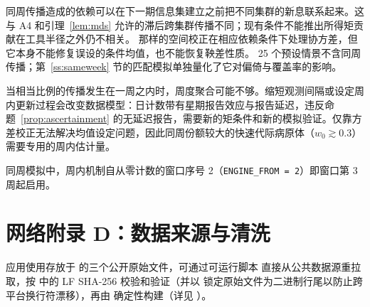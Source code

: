 \documentclass[11pt,a4paper]{ctexart}
\theoremstyle{definition}
\begin{document}
同周传播造成的依赖可以在下一期信息集建立之前把不同集群的新息联系起来。这与 A4 和引理~\ref{lem:mds} 允许的滞后跨集群传播不同；现有条件不能推出所得矩贡献在工具半径之外仍不相关。\citet{conley1999gmm} 那样的空间校正在相应依赖条件下处理协方差，但它本身不能修复误设的条件均值，也不能恢复鞅差性质。
25 个预设情景不含同周传播；第~\ref{ss:sameweek} 节的匹配模拟单独量化了它对偏倚与覆盖率的影响。

当相当比例的传播发生在一周之内时，周度聚合可能不够。缩短观测间隔或设定周内更新过程会改变数据模型：日计数带有星期报告效应与报告延迟\citep{lison2024nowcast}，违反命题~\ref{prop:ascertainment} 的无延迟报告，需要新的矩条件和新的模拟验证。仅靠方差校正无法解决均值设定问题，因此同周份额较大的快速代际病原体（$w_0\gtrsim 0.3$）需要专用的周内估计量。

同周模拟中，周内机制自从零计数的窗口序号 2（\texttt{ENGINE\_FROM = 2}）即窗口第 3 周起启用。

\section*{网络附录 D：数据来源与清洗}

应用使用存放于  的三个公开原始文件，可通过可运行脚本  直接从公共数据源重拉取，按  中的 LF SHA-256 校验和验证（并以  锁定原始文件为二进制行尾以防止跨平台换行符漂移），再由  确定性构建（详见 ）。
\end{document}
